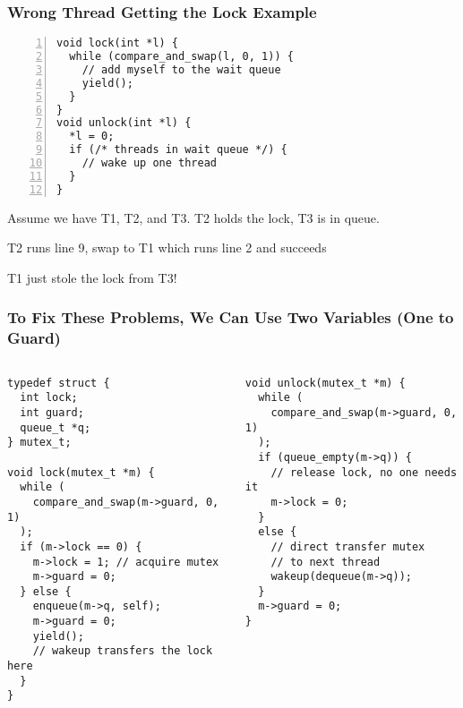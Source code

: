   \begin{frame}[fragile]
    \frametitle{Wrong Thread Getting the Lock Example}

    \begin{lstlisting}[numbers=left]
void lock(int *l) {
  while (compare_and_swap(l, 0, 1)) {
    // add myself to the wait queue
    yield();
  }
}
void unlock(int *l) {
  *l = 0;
  if (/* threads in wait queue */) {
    // wake up one thread
  }
}
    \end{lstlisting}

    Assume we have T1, T2, and T3. T2 holds the lock, T3 is in queue.

    \hspace{2em} T2 runs line 9, swap to T1 which runs line 2 and succeeds

    \hspace{4em} T1 just stole the lock from T3!
  \end{frame}

  \begin{frame}[fragile]
    \frametitle{To Fix These Problems, We Can Use Two Variables (One to Guard)}

    \begin{columns}
      \begin{column}{0.5\textwidth}
        \begin{lstlisting}[basicstyle=\scriptsize\ttfamily]
typedef struct {
  int lock;
  int guard;
  queue_t *q;
} mutex_t;

void lock(mutex_t *m) {
  while (
    compare_and_swap(m->guard, 0, 1)
  );
  if (m->lock == 0) {
    m->lock = 1; // acquire mutex
    m->guard = 0;
  } else {
    enqueue(m->q, self);
    m->guard = 0;
    yield();
    // wakeup transfers the lock here
  }
}
        \end{lstlisting}
      \end{column}
      \begin{column}{0.5\textwidth}
        \begin{lstlisting}[basicstyle=\scriptsize\ttfamily]
void unlock(mutex_t *m) {
  while (
    compare_and_swap(m->guard, 0, 1)
  );
  if (queue_empty(m->q)) {
    // release lock, no one needs it
    m->lock = 0; 
  }
  else {
    // direct transfer mutex
    // to next thread
    wakeup(dequeue(m->q));
  }
  m->guard = 0;
}
        \end{lstlisting}
      \end{column}
    \end{columns}
  \end{frame}

